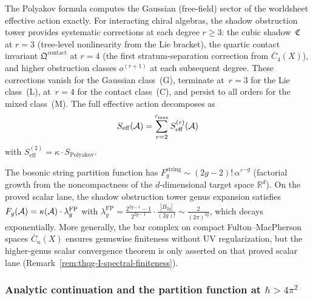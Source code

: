 \begin{remark}\label{rem:shadow-corrections-beyond-gaussian}
The Polyakov formula computes the Gaussian (free-field) sector of the worldsheet effective action exactly. For interacting chiral algebras, the shadow obstruction tower provides systematic corrections at each degree $r \geq 3$: the cubic shadow~$\mathfrak{C}$ at $r = 3$ (tree-level nonlinearity from the Lie bracket), the quartic contact invariant $\mathfrak{Q}^{\mathrm{contact}}$ at $r = 4$ (the first stratum-separation correction from $\overline{C}_4(X)$), and higher obstruction classes $o^{(r+1)}$ at each subsequent degree. These corrections vanish for the Gaussian class~(G), terminate at~$r = 3$ for the Lie class~(L), at~$r = 4$ for the contact class~(C), and persist to all orders for the mixed class~(M). The full effective action decomposes as
\[
S_{\mathrm{eff}}(\mathcal{A}) = \sum_{r=2}^{r_{\max}} S_{\mathrm{eff}}^{(r)}(\mathcal{A})
\]
with $S_{\mathrm{eff}}^{(2)} = \kappa \cdot S_{\mathrm{Polyakov}}$.
\end{remark}

\begin{remark}\label{rem:genus-expansion-convergence-comparison}
The bosonic string partition function has
$F_g^{\mathrm{string}} \sim (2g-2)!\,\alpha'^{-g}$ (factorial growth
from the noncompactness of the $d$-dimensional target space
$\mathbb{R}^d$). On the proved scalar lane, the shadow obstruction tower genus
expansion satisfies
$F_g(\mathcal{A}) = \kappa(\mathcal{A}) \cdot \lambda_g^{\mathrm{FP}}$ with
$\lambda_g^{\mathrm{FP}} = \frac{2^{2g-1}-1}{2^{2g-1}} \cdot
\frac{|B_{2g}|}{(2g)!} \sim
\frac{2}{(2\pi)^{2g}}$, which decays exponentially. More generally, the
bar complex on compact Fulton--MacPherson spaces $\overline{C}_n(X)$
ensures genuswise finiteness without UV regularization, but the
higher-genus scalar convergence theorem is only asserted on that proved
scalar lane (Remark~\ref{rem:thqg-I-spectral-finiteness}).
\end{remark}

\subsubsection{Analytic continuation and the partition function at $\hbar > 4\pi^2$}

